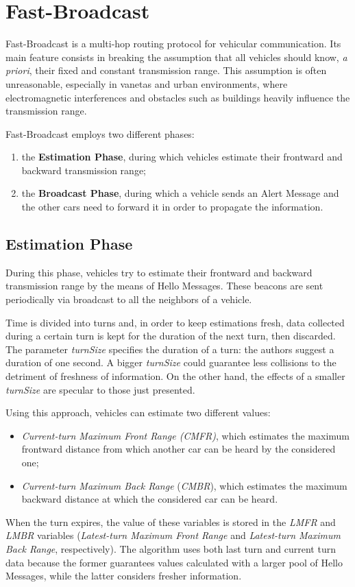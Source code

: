 
\chapter{Fast-Broadcast}
	\label{chapter:fb}
	Fast-Broadcast \cite{4199282} is a multi-hop routing protocol for vehicular communication. Its main feature consists in breaking the assumption that all vehicles should know, \textit{a priori}, their fixed and constant transmission range. This assumption is often unreasonable, especially in \acrshort{vaneta}s and urban environments, where electromagnetic interferences and obstacles such as buildings heavily influence the transmission range.
	
	
	Fast-Broadcast employs two different phases:
	\begin{enumerate}
		\item the \textbf{Estimation Phase}, during which vehicles estimate their frontward and backward transmission range;
		\item the \textbf{Broadcast Phase}, during which a vehicle sends an Alert Message and the other cars need to forward it in order to propagate the information.
	\end{enumerate}

	\section{Estimation Phase}
		During this phase, vehicles try to estimate their frontward and backward transmission range by the means of Hello Messages. These beacons are sent periodically via broadcast to all the neighbors of a vehicle.
		
		
		Time is divided into turns and, in order to keep estimations fresh, data collected during a certain turn is kept for the duration of the next turn, then discarded. The parameter \textit{turnSize} specifies the duration of a turn: the authors suggest a duration of one second. A bigger \textit{turnSize} could guarantee less collisions to the detriment of freshness of information. On the other hand, the effects of a smaller \textit{turnSize} are specular to those just presented. 
		
		
		Using this approach, vehicles can estimate two different values:
		\begin{itemize}
			\item \textit{Current-turn Maximum Front Range (\textit{CMFR})}, which estimates the maximum frontward distance from which another car can be heard by the considered one;
			\item \textit{Current-turn Maximum Back Range} (\textit{CMBR}), which estimates the maximum backward distance at which the considered car can be heard.
		\end{itemize}
		When the turn expires, the value of these variables is stored in the \textit{LMFR} and \textit{LMBR} variables (\textit{Latest-turn Maximum Front Range} and \textit{Latest-turn Maximum Back Range}, respectively). The algorithm uses both last turn and current turn data because the former guarantees values calculated with a larger pool of Hello Messages, while the latter considers fresher information.
		
